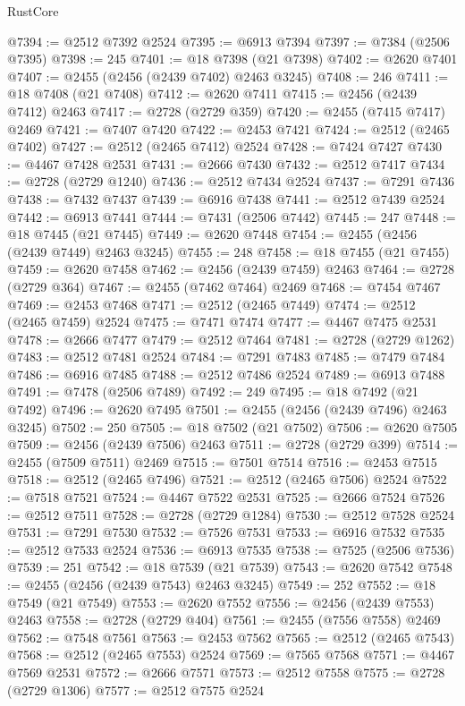 \begin{lexlean}{RustCore}
\begin{coremodule}
@7394 := @2512 @7392 @2524
@7395 := @6913 @7394
@7397 := @7384 (@2506 @7395)
@7398 := 245
@7401 := @18 @7398 (@21 @7398)
@7402 := @2620 @7401
@7407 := @2455 (@2456 (@2439 @7402) @2463 @3245)
@7408 := 246
@7411 := @18 @7408 (@21 @7408)
@7412 := @2620 @7411
@7415 := @2456 (@2439 @7412) @2463
@7417 := @2728 (@2729 @359)
@7420 := @2455 (@7415 @7417) @2469
@7421 := @7407 @7420
@7422 := @2453 @7421
@7424 := @2512 (@2465 @7402)
@7427 := @2512 (@2465 @7412) @2524
@7428 := @7424 @7427
@7430 := @4467 @7428 @2531
@7431 := @2666 @7430
@7432 := @2512 @7417
@7434 := @2728 (@2729 @1240)
@7436 := @2512 @7434 @2524
@7437 := @7291 @7436
@7438 := @7432 @7437
@7439 := @6916 @7438
@7441 := @2512 @7439 @2524
@7442 := @6913 @7441
@7444 := @7431 (@2506 @7442)
@7445 := 247
@7448 := @18 @7445 (@21 @7445)
@7449 := @2620 @7448
@7454 := @2455 (@2456 (@2439 @7449) @2463 @3245)
@7455 := 248
@7458 := @18 @7455 (@21 @7455)
@7459 := @2620 @7458
@7462 := @2456 (@2439 @7459) @2463
@7464 := @2728 (@2729 @364)
@7467 := @2455 (@7462 @7464) @2469
@7468 := @7454 @7467
@7469 := @2453 @7468
@7471 := @2512 (@2465 @7449)
@7474 := @2512 (@2465 @7459) @2524
@7475 := @7471 @7474
@7477 := @4467 @7475 @2531
@7478 := @2666 @7477
@7479 := @2512 @7464
@7481 := @2728 (@2729 @1262)
@7483 := @2512 @7481 @2524
@7484 := @7291 @7483
@7485 := @7479 @7484
@7486 := @6916 @7485
@7488 := @2512 @7486 @2524
@7489 := @6913 @7488
@7491 := @7478 (@2506 @7489)
@7492 := 249
@7495 := @18 @7492 (@21 @7492)
@7496 := @2620 @7495
@7501 := @2455 (@2456 (@2439 @7496) @2463 @3245)
@7502 := 250
@7505 := @18 @7502 (@21 @7502)
@7506 := @2620 @7505
@7509 := @2456 (@2439 @7506) @2463
@7511 := @2728 (@2729 @399)
@7514 := @2455 (@7509 @7511) @2469
@7515 := @7501 @7514
@7516 := @2453 @7515
@7518 := @2512 (@2465 @7496)
@7521 := @2512 (@2465 @7506) @2524
@7522 := @7518 @7521
@7524 := @4467 @7522 @2531
@7525 := @2666 @7524
@7526 := @2512 @7511
@7528 := @2728 (@2729 @1284)
@7530 := @2512 @7528 @2524
@7531 := @7291 @7530
@7532 := @7526 @7531
@7533 := @6916 @7532
@7535 := @2512 @7533 @2524
@7536 := @6913 @7535
@7538 := @7525 (@2506 @7536)
@7539 := 251
@7542 := @18 @7539 (@21 @7539)
@7543 := @2620 @7542
@7548 := @2455 (@2456 (@2439 @7543) @2463 @3245)
@7549 := 252
@7552 := @18 @7549 (@21 @7549)
@7553 := @2620 @7552
@7556 := @2456 (@2439 @7553) @2463
@7558 := @2728 (@2729 @404)
@7561 := @2455 (@7556 @7558) @2469
@7562 := @7548 @7561
@7563 := @2453 @7562
@7565 := @2512 (@2465 @7543)
@7568 := @2512 (@2465 @7553) @2524
@7569 := @7565 @7568
@7571 := @4467 @7569 @2531
@7572 := @2666 @7571
@7573 := @2512 @7558
@7575 := @2728 (@2729 @1306)
@7577 := @2512 @7575 @2524

\end{coremodule}
\end{lexlean}
